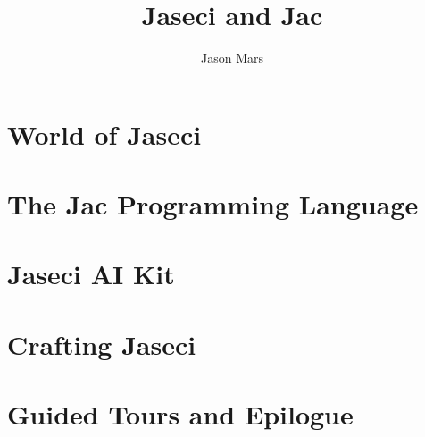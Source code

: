 \documentclass[oneside]{book}
\title{Jaseci and Jac}
\author{Jason Mars}
\begin{document}

\normalem








\part{World of Jaseci}
\label{part:jsword}









\part{The Jac Programming Language}
\label{part:jacd}










\part{Jaseci AI Kit}

\part{Crafting Jaseci}
\label{part:crafting}




\part{Guided Tours and Epilogue}









\appendix








\end{document}
